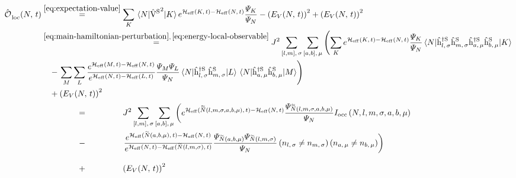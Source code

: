 \begin{equation}
    \label{eq:v-squared-hard-computation}
    \begin{split}
        \localObservable{N}{t} &\stackrel{\ref{eq:expectation-value}}{=}
        \lsum[K] \bracketHelper{N}{{\Vhamiltonian[\schroedingerPicture]}^2}{K} e^{\HeffOft[K]-\HeffOft[N]}
        \frac{
            \psiN[K]
        }{
            \psiN[N]
        }  - \left(E_V(N,\,t)\right)^2 + \left(E_V(N,\,t)\right)^2\\
        &\stackrel{\ref{eq:main-hamiltonian-perturbation},\,\ref{eq:energy-local-observable}}{=}
        J^2 \fullneighborsum[,\,\sigma]{l}{m}\fullneighborsum[,\,\mu]{a}{b}
        \left(
            \lsum[K]
            e^{\HeffOft[K]-\HeffOft[N]}
            \frac{
                \psiN[K]
            }{
                \psiN[N]
            }
            \bracketHelper{N}{\withspinhcop[\schroedingerPicture]{l}{\sigma}{\dagger}\withspinhcop[\schroedingerPicture]{m}{\sigma}{}\withspinhcop[\schroedingerPicture]{a}{\mu}{\dagger}\withspinhcop[\schroedingerPicture]{b}{\mu}{}}{K}
        \right.
        \\&\quad-
        \left.
            \lsum[M]
            \lsum[L]
            \frac{e^{\HeffOft[M]-\HeffOft[N]}}{e^{\HeffOft[N]-\HeffOft[L]}}
            \frac{
                \psiN[M]\psiN[L]
            }{
                \psiN[N]
            }
            \bracketHelper{N}{\withspinhcop[\schroedingerPicture]{l}{\sigma}{\dagger}\withspinhcop[\schroedingerPicture]{m}{\sigma}{}}{L}
            \bracketHelper{N}{\withspinhcop[\schroedingerPicture]{a}{\mu}{\dagger}\withspinhcop[\schroedingerPicture]{b}{\mu}{}}{M}
        \right) 
        \\&\quad + \left(E_V(N,\,t)\right)^2
        \\&\stackrel{\phantom{\ref{eq:expectation-value}}}{=}
        J^2 \fullneighborsum[,\,\sigma]{l}{m}\fullneighborsum[,\,\mu]{a}{b}
        \left(
            e^{\HeffOft[\vphantom{N}\smash{\tildetilde{N}}(l,m,\sigma,a,b,\mu)]-\HeffOft[N]}
            \frac{
                \psiN[\vphantom{N}\smash{\tildetilde{N}}(l,m,\sigma,a,b,\mu)]
            }{
                \psiN[N]
            }
            I_\text{occ}\left(N,l,m,\sigma,a,b,\mu\right)
        \right.
        \\&\stackrel{\phantom{\ref{eq:expectation-value}}}{-}
        \left.
            \frac{e^{\HeffOft[\vphantom{N}\smash{\tilde{N}}(a,b,\mu)]-\HeffOft[N]}}{e^{\HeffOft[N]-\HeffOft[\vphantom{N}\smash{\tilde{N}}(l,m,\sigma)]}}
            \frac{
                \psiN[\vphantom{N}\smash{\tilde{N}}(a,b,\mu)]\psiN[\vphantom{N}\smash{\tilde{N}}(l,m,\sigma)]
            }{
                \psiN[N]
            }
            \left(n_{l,\,\sigma} \neq n_{m,\,\sigma}\right)
            \left(n_{a,\,\mu} \neq n_{b,\,\mu}\right)
        \right) 
        \\&\stackrel{\phantom{\ref{eq:expectation-value}}}{+} \left(E_V(N,\,t)\right)^2
    \end{split}
\end{equation}

